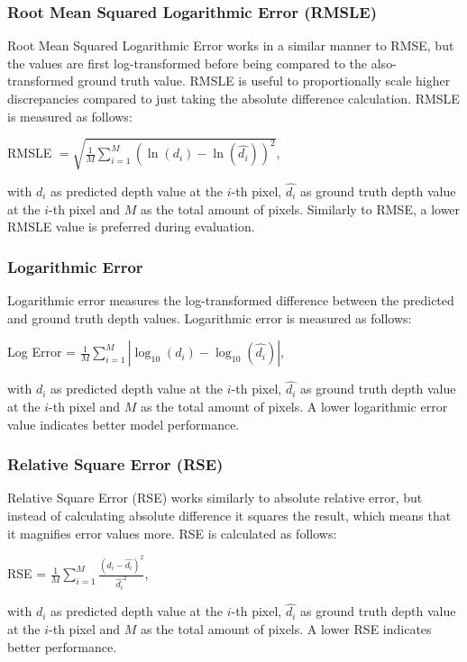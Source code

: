\subsubsection{Root Mean Squared Logarithmic Error (RMSLE)}

Root Mean Squared Logarithmic Error works in a similar manner to RMSE, but the values are first log-transformed before being compared to the also-transformed ground truth value. RMSLE is useful to proportionally scale higher discrepancies compared to just taking the absolute difference calculation. RMSLE is measured as follows:

\begin{center}
    RMSLE \(= \sqrt{\frac{1}{M} \sum\limits_{i = 1}^{M} (\ln (d_i) - \ln (\hat{d_i}))^2}\),    
\end{center}
with \(d_i\) as predicted depth value at the \(i\)-th pixel, \(\hat{d_i}\) as ground truth depth value at the \(i\)-th pixel and \(M\) as the total amount of pixels. Similarly to RMSE, a lower RMSLE value is preferred during evaluation.

\subsubsection{Logarithmic Error}

Logarithmic error measures the log-transformed difference between the predicted and ground truth depth values. Logarithmic error is measured as follows:

\begin{center}
    Log Error = \(\frac{1}{M} \sum\limits_{i = 1}^{M} |\log_{10} (d_i) - \log_{10} (\hat{d_i})|\),
\end{center}
with \(d_i\) as predicted depth value at the \(i\)-th pixel, \(\hat{d_i}\) as ground truth depth value at the \(i\)-th pixel and \(M\) as the total amount of pixels. A lower logarithmic error value indicates better model performance.

\subsubsection{Relative Square Error (RSE)}

Relative Square Error (RSE) works similarly to absolute relative error, but instead of calculating absolute difference it squares the result, which means that it magnifies error values more. RSE is calculated as follows:

\begin{center}
    RSE = \(\frac{1}{M} \sum\limits_{i = 1}^{M} \frac{(d_i - \hat{d_i})^2}{\hat{d_i}^2}\),
\end{center}
with \(d_i\) as predicted depth value at the \(i\)-th pixel, \(\hat{d_i}\) as ground truth depth value at the \(i\)-th pixel and \(M\) as the total amount of pixels. A lower RSE indicates better performance.

